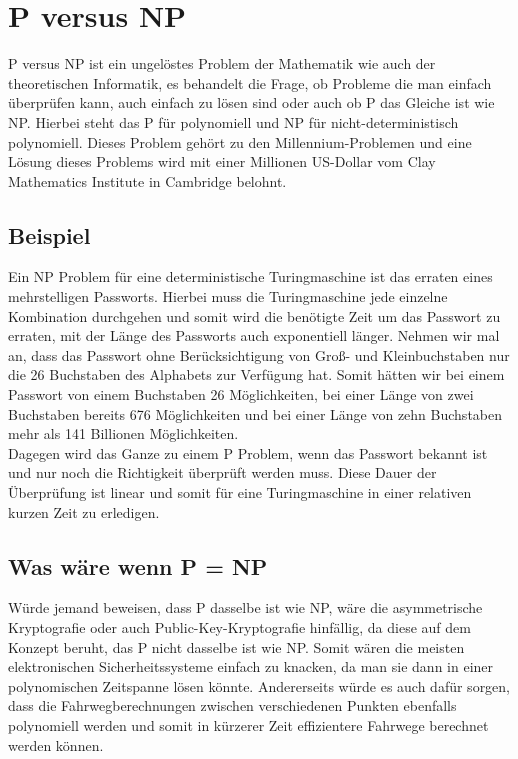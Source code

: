\section{P versus NP}
\label{P versus NP}
P versus NP ist ein ungelöstes Problem der Mathematik wie auch der theoretischen Informatik, es behandelt die Frage, ob Probleme die man einfach überprüfen kann, auch einfach zu lösen sind oder auch ob P das Gleiche ist wie NP. Hierbei steht das P für polynomiell und NP für nicht-deterministisch polynomiell. Dieses Problem gehört zu den Millennium-Problemen und eine Lösung dieses Problems wird mit einer Millionen US-Dollar vom Clay Mathematics Institute in Cambridge belohnt.

\subsection{Beispiel}
Ein NP Problem für eine deterministische Turingmaschine ist das erraten eines mehrstelligen Passworts. Hierbei muss die Turingmaschine jede einzelne Kombination durchgehen und somit wird die benötigte Zeit um das Passwort zu erraten, mit der Länge des Passworts auch exponentiell länger. 
Nehmen wir mal an, dass das Passwort ohne Berücksichtigung von Groß- und Kleinbuchstaben nur die 26 Buchstaben des Alphabets zur Verfügung hat. Somit hätten wir bei einem Passwort von einem Buchstaben 26 Möglichkeiten, bei einer Länge von zwei Buchstaben bereits 676 Möglichkeiten und bei einer Länge von zehn Buchstaben mehr als 141 Billionen Möglichkeiten.
\\
Dagegen wird das Ganze zu einem P Problem, wenn das Passwort bekannt ist und nur noch die Richtigkeit überprüft werden muss. Diese Dauer der Überprüfung ist linear und somit für eine Turingmaschine in einer relativen kurzen Zeit zu erledigen.

\subsection{Was wäre wenn P = NP}
Würde jemand beweisen, dass P dasselbe ist wie NP, wäre die asymmetrische Kryptografie oder auch Public-Key-Kryptografie hinfällig, da diese auf dem Konzept beruht, das P nicht dasselbe ist wie NP. Somit wären die meisten elektronischen Sicherheitssysteme einfach zu knacken, da man sie dann in einer polynomischen Zeitspanne lösen könnte.
Andererseits würde es auch dafür sorgen, dass die Fahrwegberechnungen zwischen verschiedenen Punkten ebenfalls polynomiell werden und somit in kürzerer Zeit effizientere Fahrwege berechnet werden können.


